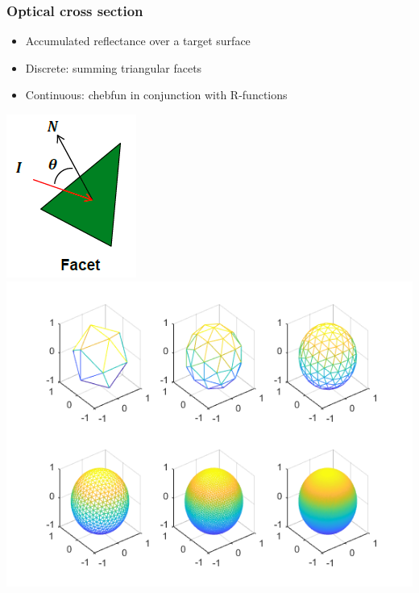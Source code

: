 \documentclass{beamer}
\begin{document}
\begin{frame}[t]
\frametitle{Optical cross section}
\begin{itemize}
\item Accumulated reflectance over a target surface
\item Discrete: summing triangular facets
\item Continuous: chebfun in conjunction with R-functions
\end{itemize}
\centerline{\includegraphics[scale = 0.5]{./figs/facet.png} \: \includegraphics[scale = 0.5]{./figs/icosahedron.png}}
\end{frame}
\end{document}
